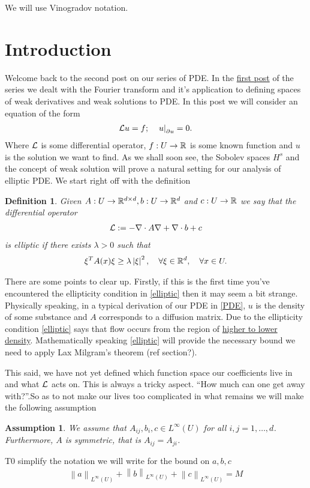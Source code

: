\documentclass[12pt]{article}
\newtheorem{definition}{Definition}
\newtheorem{assumption}{Assumption}
\renewcommand{\norm}[1]{\left\lVert #1 \right\rVert}\renewcommand{\abs}[1]{\left| #1 \right|}
\newcommand\restr[2]{\left.#1\right|_{#2}}
\begin{document}
We will use Vinogradov notation.

\section{Introduction}
Welcome back to the second post on our series of PDE. In the \href{https://nowheredifferentiable.com/2023-01-29-PDE-1/}{first post} of the series we dealt with the Fourier transform and it's application to defining spaces of weak derivatives and weak solutions to PDE. In this post we will consider an equation of the form
\begin{align}\label{PDE}
  \Ll u =f; \quad \restr{u}{\partial u} =0.
\end{align}
Where $\mathcal{L}$ is some differential operator, $f: U \to  \mathbb{R}$  is some known function and $u$ is the solution we want to find. As we shall soon see, the Sobolev spaces $H^s$ and the concept of weak solution will prove a natural setting for our analysis of elliptic PDE. We start right off with the definition
\begin{definition}
  Given $A: U \to \mathbb{R}^{d \times d}, b: U \to \mathbb{R}^d$ and $c:U \to \mathbb{R}$ we say that the differential operator
  \begin{align}\label{operator}
    \mathcal{L}:= -\nabla \cdot A \nabla + \nabla \cdot b +c\end{align}
  is \emph{elliptic} if there exists $\lambda >0$ such that
  \begin{align}\label{elliptic}
    \xi ^TA(x) \xi  \geq \lambda \abs{\xi }^2 , \quad\forall \xi \in \R^d , \quad\forall x \in U .
  \end{align}
\end{definition}
There are some points to clear up. Firstly, if this is the first time you've encountered  the ellipticity condition in \eqref{elliptic} then it may seem a bit strange.  Physically speaking, in a typical derivation of our PDE in \eqref{PDE}, $u$ is the density of some substance and $A$ corresponds to a diffusion matrix. Due to the ellipticity condition \eqref{elliptic} says that flow occurs from the region of \href{https://nowheredifferentiable.com/2023-12-23-PDEs-4-Physical_derivation_of_parabolic_and_elliptic_PDE/#:~:text=a)-,Diffusion,-%3A%20This%20is%20the}{higher to lower density}. Mathematically speaking \eqref{elliptic} will provide the necessary bound we need to apply Lax Milgram's theorem (ref section?).

This said, we have not yet defined which function space our coefficients live in and what $\mathcal{L}$ acts on. This is always a tricky aspect. ``How much can one get away with?''.So as to not make our lives too complicated in what remains we will make the following assumption
\begin{assumption}\label{Ass1}
  We assume that  $A_{ij}, b_i, c \in L^\infty (U)$ for all $i,j=1,\ldots,d$. Furthermore, $A$ is symmetric, that is  $A_{ij}=A_{ji}$.
\end{assumption}
T0 simplify the notation we will write for the bound on $a,b,c$
\begin{align*}
  \norm{a}_{L^\infty(U)}+\norm{b}_{L^\infty(U)}+\norm{c}_{L^\infty(U)}=M
\end{align*}
\end{document}

